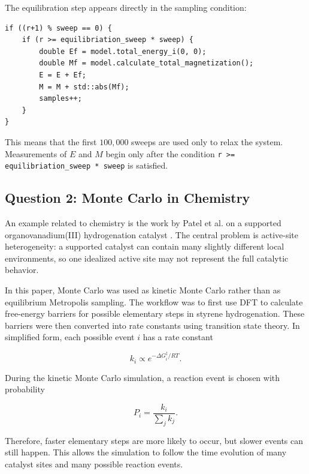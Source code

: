 \documentclass[11pt]{article}
\let\oldsubsection\subsection
\renewcommand{\subsection}[1]{\Needspace{2\baselineskip}\oldsubsection{#1}}
\begin{document}
The equilibration step appears directly in the sampling condition:

\begin{lstlisting}[style=cppstyle]
if ((r+1) % sweep == 0) {
    if (r >= equilibriation_sweep * sweep) {
        double Ef = model.total_energy_i(0, 0);
        double Mf = model.calculate_total_magnetization();
        E = E + Ef;
        M = M + std::abs(Mf);
        samples++;
    }
}
\end{lstlisting}

This means that the first $100{,}000$ sweeps are used only to relax the system. Measurements of $E$ and $M$ begin only after the condition \texttt{r >= equilibriation\_sweep * sweep} is satisfied.

\subsection{Question 2: Monte Carlo in Chemistry}

An example related to chemistry is the work by Patel et al. on a supported organovanadium(III) hydrogenation catalyst \cite{patel2021}. The central problem is active-site heterogeneity: a supported catalyst can contain many slightly different local environments, so one idealized active site may not represent the full catalytic behavior.

In this paper, Monte Carlo was used as kinetic Monte Carlo rather than as equilibrium Metropolis sampling. The workflow was to first use DFT to calculate free-energy barriers for possible elementary steps in styrene hydrogenation. These barriers were then converted into rate constants using transition state theory. In simplified form, each possible event $i$ has a rate constant

\medskip

\begin{equation}
k_i \propto e^{-\Delta G_i^\ddagger / RT}.
\end{equation}

\medskip
During the kinetic Monte Carlo simulation, a reaction event is chosen with probability

\medskip

\begin{equation}
P_i=\frac{k_i}{\sum_j k_j}.
\end{equation}

\medskip
Therefore, faster elementary steps are more likely to occur, but slower events can still happen. This allows the simulation to follow the time evolution of many catalyst sites and many possible reaction events.
\end{document}
